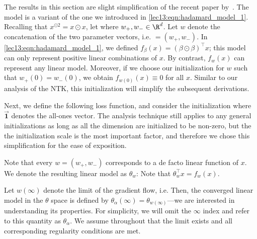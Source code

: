 The results in this section are slight simplification of the recent paper by~\citet{woodworth2020kernel}. The model is a variant of the one we introduced in \eqref{lec13:eqn:hadamard_model_1}. Recalling that $x^{\odot 2} = x \odot x$, let
where $w_+, w_- \in \R^d$. Let $w$ denote the concatenation of the two parameter vectors, i.e. $= (w_+, w_-)$.  In \eqref{lec13:eqn:hadamard_model_1}, we defined $f_\beta(x) = (\beta \odot \beta)^\top x$; this model can only represent positive linear combinations of $x$.  By contrast, $f_w(x)$ can represent any linear model. Moreover, if we choose our initialization for $w$ such that $w_+(0) = w_-(0)$, we obtain $f_{w(0)}(x) \equiv 0$ for all $x$. Similar to our analysis of the NTK, this initialization will simplify the subsequent derivations.

Next, we define the following loss function,
and consider the initialization
where $\vec{\mathbf{1}}$ denotes the all-ones vector. The analysis technique still applies to any general initializations as long as all the dimension are initialized to be non-zero, but the the initialization scale is the most important factor, and therefore we chose this simplification for the ease of exposition. 

Note that every $w = (w_+, w_{-})$ corresponds to a de facto linear function of $x$. We denote the resulting linear model as $\theta_w$:
Note that $\theta_w^\top x = f_w(x)$. 

Let $w(\infty)$ denote the limit of the gradient flow, i.e.
Then, the converged linear model in the $\theta$ space is defined by $\theta_\alpha(\infty) = \theta_{w(\infty)}$---we are interested in understanding its properties.  For simplicity, we will omit the $\infty$ index and refer to this quantity as $\theta_\alpha$. We assume throughout that the limit exists and all corresponding regularity conditions are met.

